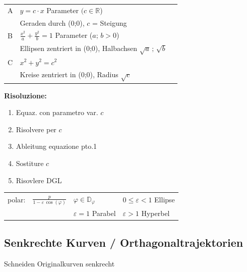 \begin{minipage}{0.7\columnwidth}
    \begin{tabular}{lll}
        A   & $y = c \cdot x$ \quad Parameter $(c \in \mathbb{R}$)                  \\  \smallskip
    	& Geraden durch (0;0), $c$ = Steigung                                   \\
        B   & $\frac{x^2}{a} + \frac{y^2}{b} = 1$ \quad Parameter ($a; \, b > 0$)   \\  \smallskip
        & Ellipsen zentriert in (0;0), Halbachsen $\sqrt{a} \, ; \, \sqrt{b}$   \\  
        C   & $x^2 + y^2 = c^2$ \\ 
        & Kreise zentriert in (0;0), Radius $\sqrt{c}$
    \end{tabular}
\end{minipage}
\begin{minipage}{0.3\columnwidth}
    \textbf{Risoluzione:}
    \begin{enumerate}
        \item Equaz. con parametro var. $c$
        \item Risolvere per $c$
        \item Ableitung equazione pto.1
        \item Sostiture $c$
        \item Risovlere DGL
    \end{enumerate}
\end{minipage}
    
\medskip

\begin{tabular}{llll}
    polar:  & $\frac{p}{1- \varepsilon \, \cos(\varphi)}$   & $\varphi \in \mathbb{D}_{\varphi}$    & $0 \leq \varepsilon < 1$ Ellipse \\
            &                                               & $\varepsilon = 1$ Parabel             & $\varepsilon > 1$ Hyperbel
\end{tabular}


\subsection{Senkrechte Kurven / Orthagonaltrajektorien}

Schneiden Originalkurven  senkrecht

\smallskip

